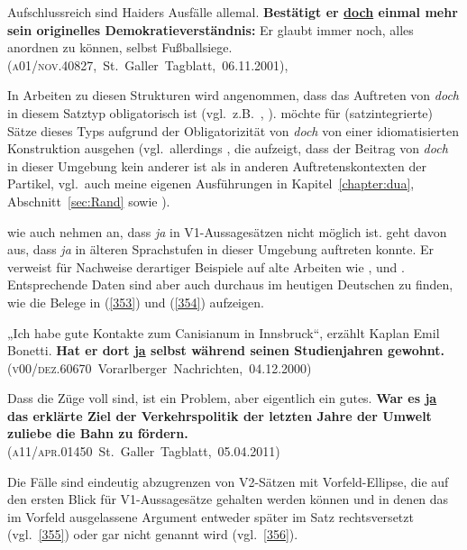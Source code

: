 \begin{exe}
	\ex\label{352} 

	Aufschlussreich sind Haiders Ausfälle allemal. \textbf{Bestätigt er \underline{doch} einmal mehr sein originelles Demo\-kratieverständnis:} Er glaubt 		immer noch, alles anordnen zu können, selbst Fußballsiege.  
	\newline
	\hbox{}\hfill\hbox{(\textsc{a01/nov.40827}, St. Galler Tagblatt, 06.11.2001), \citet[157]{Pittner2011}}	
\end{exe}
In Arbeiten zu diesen Strukturen wird angenommen, dass das Auftreten von \textit{doch} in diesem Satztyp obligatorisch ist (vgl.\ z.B.\ \citealt[295]{Oennerfors1997}, \citealt[172]{Pittner2011}). \citet[174]{Rinas2006} möchte für (satzintegrierte) Sätze dieses Typs aufgrund der Obligatorizität von \textit{doch} von einer idiomatisierten Konstruktion ausgehen (vgl.\ allerdings \citealt[162--169]{Pittner2011}, die aufzeigt, dass der Beitrag von \textit{doch} in dieser Umgebung kein anderer ist als in anderen Auftretenskontexten der Partikel, vgl.\ auch meine eigenen Ausführungen in Kapitel~\ref{chapter:dua}, Abschnitt~\ref{sec:Rand} sowie \citealt{MuellerimDruck}).

\citet[174]{Rinas2006} wie auch \citet[90]{Kwon2005} nehmen an, dass \textit{ja} in V1-Aus\-sage\-sät\-zen  nicht möglich ist. \citet[158]{Oennerfors1997} geht davon aus, dass \textit{ja} in älteren Sprachstufen in dieser Umgebung auftreten konnte. Er verweist für Nachweise derartiger Beispiele auf alte Arbeiten wie \citet[74--75]{Sanders1883}, \citet[36--37]{Stenstad1917} und \citet[70--71]{Mattausch1965}. Entsprechende Daten sind aber auch durch\-aus im heutigen Deutschen zu finden, wie die Belege in (\ref{353}) und (\ref{354}) aufzeigen.

\begin{exe}
	\ex\label{353} 

	„Ich habe gute Kontakte zum Canisianum in Innsbruck“, erzählt Kaplan Emil Bonetti. \textbf{Hat er dort \underline{ja} selbst während seinen 	Studienjahren gewohnt. }
	\hbox{}\hfill\hbox{(\textsc{v00/dez.60670} Vorarlberger Nachrichten, 04.12.2000)}	
\end{exe}

\begin{exe}
	\ex\label{354} 

	Dass die Züge voll sind, ist ein Problem, aber eigentlich ein gutes. \textbf{War es \underline{ja} das erklärte Ziel der Verkehrspolitik der letzten 		Jahre der Umwelt zuliebe die Bahn zu fördern.}
	\newline
	\hbox{}\hfill\hbox{(\textsc{a11/apr.01450} St. Galler Tagblatt, 05.04.2011)}	
\end{exe}
Die Fälle sind eindeutig abzugrenzen von V2-Sätzen mit Vorfeld-Ellipse, die auf den ersten Blick für V1-Aussagesätze gehalten werden können und in denen das im Vorfeld ausgelassene Argument entweder später im Satz rechtsversetzt (vgl.\ \ref{355}) oder gar nicht genannt wird (vgl.\ \ref{356}).
	
